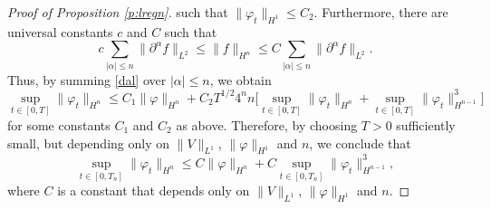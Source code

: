 \documentclass[11pt,a4paper,draft,DIV11]{scrartcl}	%
\begin{document}
\begin{proof}[Proof of Proposition \ref{p:lregn}]
  such that $\| \varphi_t \|_{H^1} \le C_2$. Furthermore, there are universal
  constants $c$ and $C$ such that
  \[
    c \sum_{|\alpha| \le n} \| \partial^\alpha f \|_{L^2} \le \| f \|_{H^n}
    \le C \sum_{|\alpha| \le n} \| \partial^\alpha f \|_{L^2}.
  \]
  Thus, by summing \eqref{dal} over $|\alpha| \le n$, we obtain
  \[
    \sup_{t \in [0,T]} \| \varphi_t \|_{H^n} \le C_1 \| \varphi \|_{H^n} + C_2
    T^{1/2} 4^n n \Big[ \sup_{t \in [0,T]} \| \varphi_t \|_{H^n} + \sup_{t \in
    [0,T]} \| \varphi_t \|_{H^{n-1}}^3 \Big]
  \]
  for some constants $C_1$ and $C_2$ as above. Therefore, by choosing $T > 0$
  sufficiently small, but depending only on $\| V \|_{L^1}$, $\| \varphi
  \|_{H^1}$ and $n$, we conclude that
  \[
    \sup_{t \in [0,T_n]} \| \varphi_t \|_{H^n} \le C \| \varphi \|_{H^n} + C
    \sup_{t \in [0,T_n]} \| \varphi_t \|_{H^{n-1}}^3,
  \]
  where $C$ is a constant that depends only on $\| V \|_{L^1}$, $\| \varphi
  \|_{H^1}$ and $n$.
\end{proof}
\end{document}

